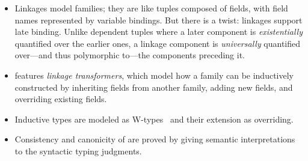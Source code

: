\begin{itemize}
[labelsep=*,leftmargin=1pc,itemsep=3pt]
\item 
Linkages model families; they are like tuples composed of fields,
with field names represented by variable bindings.
But there is a twist: linkages support late binding.
Unlike dependent tuples where a later component is \emph{existentially}
quantified over the earlier ones, a linkage component is \emph{universally}
quantified over---and thus polymorphic to---the components preceding it.

\item
\TT features \emph{linkage transformers}, which model how a family can be
inductively constructed by inheriting fields from another family,
adding new fields, and overriding existing fields.
\item
Inductive types are modeled as W-types~\cite{martin1984intuitionistic} and their
extension as overriding.

\item
Consistency and canonicity of \TT are proved by giving semantic interpretations to the syntactic typing judgments.
\end{itemize}



% 




